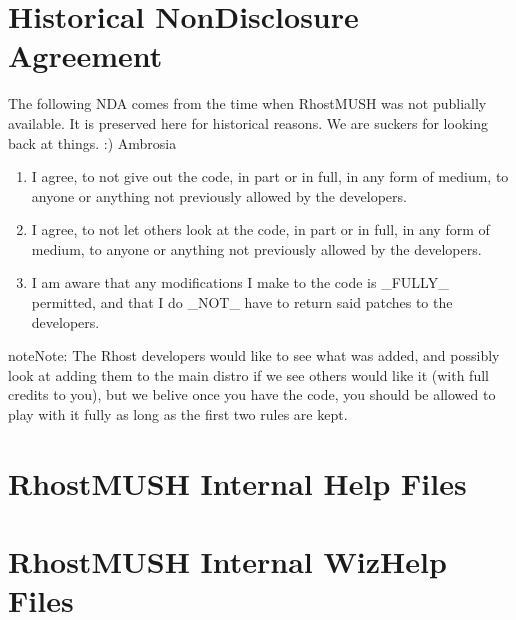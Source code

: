 \documentclass[letterpaper,10pt,english]{sphinxmanual}
\begin{document}
\chapter{Historical Non\sphinxhyphen{}Disclosure Agreement}
\label{\detokenize{historical/nda:historical-non-disclosure-agreement}}\label{\detokenize{historical/nda:index-0}}\label{\detokenize{historical/nda::doc}}
\sphinxAtStartPar
The following NDA comes from the time when RhostMUSH was not publially
available. It is preserved here for historical reasons. We are suckers for
looking back at things. :)
\sphinxhyphen{}\sphinxhyphen{}Ambrosia
\begin{enumerate}
%
\item {} 
\sphinxAtStartPar
I agree, to not give out the code, in part or in full, in any form of
medium, to anyone or anything not previously allowed by the developers.

\item {} 
\sphinxAtStartPar
I agree, to not let others look at the code, in part or in full, in
any form of medium, to anyone or anything not previously allowed by the
developers.

\item {} 
\sphinxAtStartPar
I am aware that any modifications I make to the code is \_FULLY\_
permitted, and that I do \_NOT\_ have to return said patches to the
developers.

\end{enumerate}

\begin{sphinxadmonition}{note}{Note:}
\sphinxAtStartPar
The Rhost developers would like to see what was added, and possibly
look at adding them to the main distro if we see others would like
it (with full credits to you), but we belive once you have the code,
you should be allowed to play with it fully as long as the first two
rules are kept.
\end{sphinxadmonition}


\chapter{RhostMUSH Internal Help Files}
\label{\detokenize{help:rhostmush-internal-help-files}}\label{\detokenize{help::doc}}



\chapter{RhostMUSH Internal WizHelp Files}
\label{\detokenize{wizhelp:rhostmush-internal-wizhelp-files}}\label{\detokenize{wizhelp::doc}}
\end{document}
